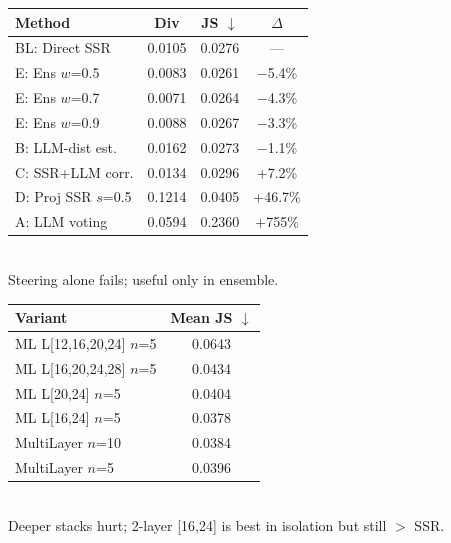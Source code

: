 \documentclass[10pt,a4paper]{article}
\begin{document}
\begin{minipage}[t]{0.48\textwidth}
\vspace{-4pt}
\centering\small
\begin{tabular}{@{}lccc@{}}
\toprule
Method & Div & JS $\downarrow$ & $\Delta$ \\
\midrule
BL: Direct SSR & 0.0105 & 0.0276 & --- \\
\rowcolor{bestrow} E: Ens $w$=0.5 & 0.0083 & 0.0261 & $-$5.4\% \\
E: Ens $w$=0.7 & 0.0071 & 0.0264 & $-$4.3\% \\
E: Ens $w$=0.9 & 0.0088 & 0.0267 & $-$3.3\% \\
B: LLM-dist est. & 0.0162 & 0.0273 & $-$1.1\% \\
C: SSR+LLM corr. & 0.0134 & 0.0296 & +7.2\% \\
D: Proj SSR $s$=0.5 & 0.1214 & 0.0405 & +46.7\% \\
A: LLM voting & 0.0594 & 0.2360 & +755\% \\
\bottomrule
\end{tabular}
\\[2pt]
{\scriptsize Steering alone fails; useful only in ensemble.}
\end{minipage}
\hfill
\begin{minipage}[t]{0.48\textwidth}
\vspace{-4pt}
\centering\small
\begin{tabular}{@{}lc@{}}
\toprule
Variant & Mean JS $\downarrow$ \\
\midrule
ML L[12,16,20,24] $n$=5 & 0.0643 \\
ML L[16,20,24,28] $n$=5 & 0.0434 \\
ML L[20,24] $n$=5 & 0.0404 \\
ML L[16,24] $n$=5 & 0.0378 \\
MultiLayer $n$=10 & 0.0384 \\
MultiLayer $n$=5 & 0.0396 \\
\bottomrule
\end{tabular}
\\[2pt]
{\scriptsize Deeper stacks hurt; 2-layer [16,24] is best in isolation but still $>$ SSR.}
\end{minipage}

\vspace{8pt}
\end{document}

